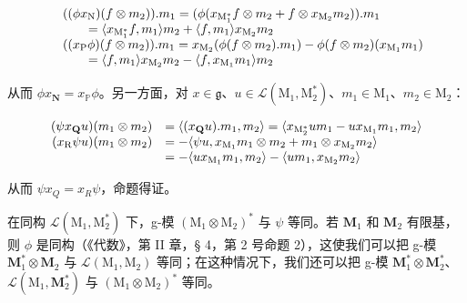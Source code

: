 \[
\begin{array}{r l} & {((\phi x _ {\mathrm{N}}) (f \otimes m _ {2})). m _ {1} = (\phi (x _ {\mathrm{M} _ {1} ^ {*}} f \otimes m _ {2} + f \otimes x _ {\mathrm{M} _ {2}} m _ {2})). m _ {1}} \\ & {\qquad = \langle x _ {\mathrm{M} _ {1} ^ {*}} f, m _ {1} \rangle m _ {2} + \langle f, m _ {1} \rangle x _ {\mathrm{M} _ {2}} m _ {2}} \\ & {((x _ {\mathrm{P}} \phi) (f \otimes m _ {2})). m _ {1} = x _ {\mathrm{M} _ {2}} (\phi (f \otimes m _ {2}). m _ {1}) - \phi (f \otimes m _ {2}) (x _ {\mathrm{M} _ {1}} m _ {1})} \\ & {\qquad = \langle f, m _ {1} \rangle x _ {\mathrm{M} _ {2}} m _ {2} - \langle f, x _ {\mathrm{M} _ {1}} m _ {1} \rangle m _ {2}} \end{array}
\]

从而 \(\phi x_{\mathbf{N}} = x_{\mathbb{P}}\phi\)。另一方面，对 \(x \in \mathfrak{g}\)、\(u \in \mathcal{L}(\mathrm{M}_1, \mathrm{M}_2^*)\)、\(m_1 \in \mathrm{M}_1\)、\(m_2 \in \mathrm{M}_2\)：

\[
\begin{array}{r l} (\psi x _ {\mathbf {Q}} u) (m _ {1} \otimes m _ {2}) & = \langle (x _ {\mathbf {Q}} u). m _ {1}, m _ {2} \rangle = \langle x _ {\mathrm{M} _ {2} ^ {*}} u m _ {1} - u x _ {\mathrm{M} _ {1}} m _ {1}, m _ {2} \rangle \\ (x _ {\mathrm{R}} \psi u) (m _ {1} \otimes m _ {2}) & = - \langle \psi u, x _ {\mathrm{M} _ {1}} m _ {1} \otimes m _ {2} + m _ {1} \otimes x _ {\mathrm{M} _ {2}} m _ {2} \rangle \\ & = - \langle u x _ {\mathrm{M} _ {1}} m _ {1}, m _ {2} \rangle - \langle u m _ {1}, x _ {\mathrm{M} _ {2}} m _ {2} \rangle \end{array}
\]

从而 \(\psi x_{Q} = x_{R}\psi\)，命题得证。

在同构 \(\mathcal{L}(\mathrm{M}_1,\mathrm{M}_2^*)\) 下，g-模 \((\mathrm{M}_1\otimes \mathrm{M}_2)^*\) 与 \(\psi\) 等同。若 \(\mathbf{M}_1\) 和 \(\mathbf{M}_2\) 有限基，则 \(\phi\) 是同构（《代数》，第 II 章，§ 4，第 2 号命题 2），这使我们可以把 g-模 \(\mathbf{M}_1^*\otimes \mathbf{M}_2\) 与 \(\mathcal{L}(\mathrm{M}_1,\mathrm{M}_2)\) 等同；在这种情况下，我们还可以把 g-模 \(\mathbf{M}_1^*\otimes \mathbf{M}_2^*\)、\(\mathcal{L}(\mathrm{M}_1,\mathbf{M}_2^*)\) 与 \((\mathrm{M}_1\otimes \mathrm{M}_2)^*\) 等同。

